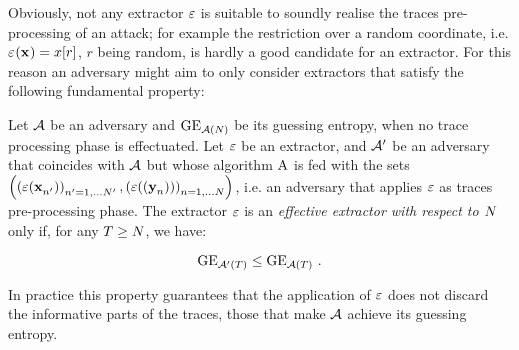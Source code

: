 Obviously, not any extractor $\extract$ is suitable to soundly realise the traces pre-processing of an attack; for example the restriction over a random coordinate, i.e. $\extractor{\sss[]{}} = x[r]$, $r$ being random, is hardly a good candidate for an extractor. For this reason an adversary might aim to only consider extractors that satisfy the following fundamental property:

\begin{property}
Let $\adversary$ be an adversary and $\guessingEntropy_{\adversary(\numTraces[])}$ be its guessing entropy, when no trace processing phase is effectuated. Let $\extract$ be an extractor, and $\adversary'$ be an adversary that coincides with $\adversary$ but whose algorithm $\attackAlgorithm$ is fed with the sets $ \left( \left(\extract(\sss[]{n'})\right)_{n'=1,\dots \numTraces[]'}, \left(\extract((\sssTest[]{n}))\right)_{n=1,\dots \numTraces[]} \right)$, i.e. an adversary that applies $\extract$ as traces pre-processing phase. The extractor $\extract$ is an {\em effective  extractor with respect to $\numTraces[]$} only if, for any $T \geq\numTraces[] $, we have:

\begin{equation}\label{eq:effective}
\guessingEntropy_{\adversary'(T)} \leq \guessingEntropy_{\adversary(T)}\mbox{ .}
\end{equation}

\end{property}
In practice this property guarantees that the application of $\extract$ does not discard the informative parts of the traces, those that make $\adversary$ achieve its guessing entropy.















